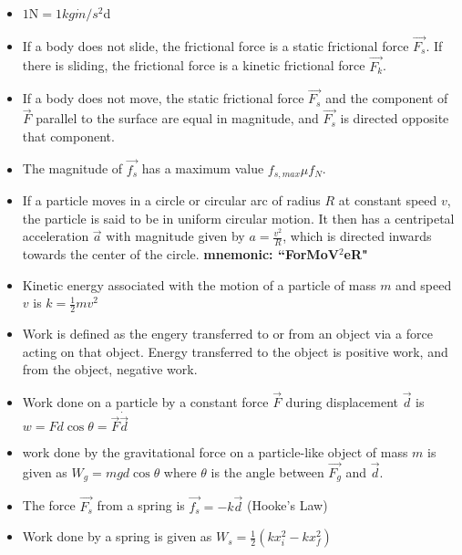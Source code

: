 \documentclass[10pt,letterpaper]{article}
\begin{document}
\begin{itemize}
\item $1 \mbox{N}=1 kg\dot m/s^2$d



\item If a body does not slide, the frictional force is a static frictional force $\vec{F_s}$. If there is sliding, the frictional force is a kinetic frictional force $\vec{F_k}$. 
\item If a body does not move, the static frictional force $\vec{F_s}$ and the component of $\vec{F}$ parallel to the surface are equal in magnitude, and $\vec{F_s}$ is directed opposite that component. 
\item The magnitude of $\vec{f_s}$ has a maximum value $f_{s,max}\mu f_N$. 
\item If a particle moves in a circle or circular arc of radius $R$ at constant speed $v$, the particle is said to be in uniform circular motion. It then has a centripetal acceleration $\vec{a}$ with magnitude given by $a=\frac{v^2}{R}$, which is directed inwards towards the center of the circle. \textbf{mnemonic: ``ForMoV$^2$eR"}

\item Kinetic energy associated with the motion of a particle of mass $m$ and speed $v$ is $k=\frac{1}{2}mv^2$ 

\item Work is defined as the engery transferred to or from an object via a force acting on that object. Energy transferred to the object is positive work, and from the object, negative work. 
\item Work done on a particle by a constant force $\vec{F}$ during displacement $\vec{d}$ is $w=Fd\cos \theta = \vec{F}\dot \vec{d}$ 
\item work done by the gravitational force on a particle-like object of mass $m$ is given as $W_g=mgd\cos \theta$ where $\theta$ is the angle between $\vec{F_g}$ and $\vec{d}$. 
\item The force $\vec{F_s}$ from a spring is $\vec{f_s}=-k\vec{d}$ (Hooke's Law)
\item Work done by a spring is given as $W_s=\frac{1}{2}(kx_{i}^2-kx_f^2)$

\end{itemize}
\end{document}

